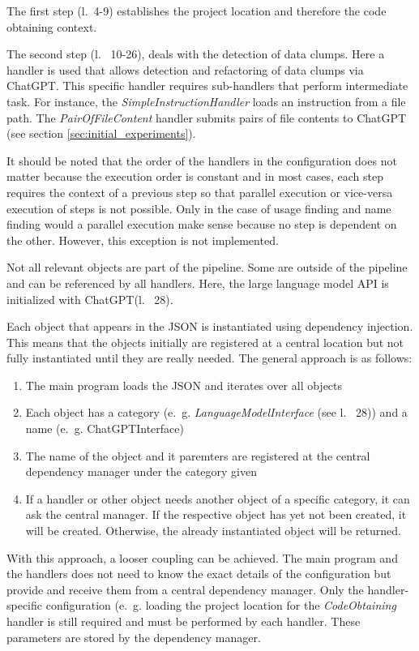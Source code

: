 The first step (l.~4-9) establishes the project location and therefore the code obtaining context.

The second step (l.~ 10-26), deals with the detection of data clumps. Here a handler is used that allows detection and refactoring of data clumps via ChatGPT. This specific handler requires sub-handlers that perform intermediate task. For instance, the \textit{SimpleInstructionHandler} loads an instruction from a file path. The \textit{PairOfFileContent} handler submits pairs of file contents to ChatGPT (see section \ref{sec:initial_experiments}).

It should be noted that the order of the handlers in the configuration  does not matter because the execution order is constant and in most cases, each step requires the context of a previous step so that parallel execution or vice-versa execution of steps is not possible. Only in the case of usage finding and name finding would a parallel execution make sense because no step is dependent on the other.  However, this exception is not implemented.

Not all relevant objects are part of the pipeline. Some are outside of the pipeline and can be referenced by all handlers. Here, the large language model \ac{API} is initialized with ChatGPT(l.~ 28).

Each object that appears in the \ac{JSON} is instantiated using dependency injection. This means that the objects initially are registered at a central location but not fully instantiated until they are really needed. The general approach is as follows:
\begin{enumerate}
    \item The main program loads the \ac{JSON} and iterates over all objects
    \item Each object has a category (e.~g. \textit{LanguageModelInterface} (see l.~ 28)) and a name (e.~g. ChatGPTInterface) 
    \item The name of the object and it paremters are registered at the central dependency manager under the category given
    \item If a handler or other object needs another object of a specific category, it can ask the central manager. If the respective object has  yet not been created, it will be created. Otherwise, the already instantiated object will be returned. 
\end{enumerate}
With this approach, a looser coupling can be achieved. The main program and the handlers does not need to know the exact details of the configuration but provide and receive them from a central dependency manager. Only the handler-specific configuration (e.~g. loading the project location  for the \textit{CodeObtaining} handler is still required and must be performed by each handler. These parameters are stored by the dependency manager. 


